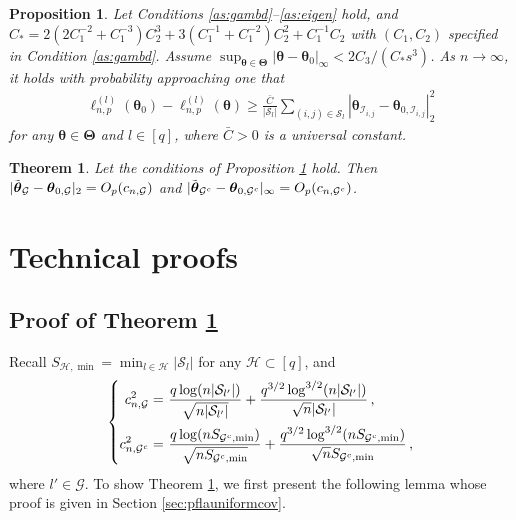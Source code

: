 \documentclass[10pt,a4paper]{amsart}
\theoremstyle{plain}
\newtheorem{theorem}{Theorem}
\newtheorem{proposition}{Proposition}
\theoremstyle{remark}
\newcommand{\btheta}{\boldsymbol \theta}
\newcommand{\bTheta}{\boldsymbol \Theta}
\newcommand{\btc}{{\rm c}}
\begin{document}
\begin{proposition}\label{pn:ident}
Let Conditions {\rm\ref{as:gambd}--\ref{as:eigen}} hold, and $C_*=2(2C_1^{-2}+C_1^{-3})C_2^3+3(C_1^{-1}+C_1^{-2})C_2^2+C_1^{-1}C_2$ with $(C_1,C_2)$ specified in Condition {\rm\ref{as:gambd}}. Assume $\sup_{\btheta\in\bTheta}|\btheta-\btheta_0|_\infty<2C_3/(C_*s^3)$.
As $n\rightarrow\infty$, it holds 
with probability approaching one that 
\begin{align*}
\ell_{n,p}^{(l)}(\btheta_0)-\ell_{n,p}^{(l)}(\btheta)\geq \frac{\bar{C}}{|\mathcal{S}_l|}\sum_{(i,j)\in\mathcal{S}_l}|\btheta_{\mathcal{I}_{i,j}}-\btheta_{0,\mathcal{I}_{i,j}}|_2^2
\end{align*}
for any $\btheta\in\bTheta$ and $l\in[q]$, where $\bar{C}>0$ is a universal constant.  
\end{proposition}

\begin{theorem}\label{tm:consistency}
Let the conditions of Proposition {\rm\ref{pn:ident}} hold. Then $|\tilde{\btheta}_{\mathcal{G}}-\btheta_{0,\mathcal{G}}|_2=O_{\rm p}(c_{n,\mathcal{G}})$ and $|\tilde{\btheta}_{\mathcal{G}^{\btc}}-\btheta_{0,\mathcal{G}^{\btc}}|_\infty=O_{\rm p}(c_{n,\mathcal{G}^{\btc}})$. 
\end{theorem}

\section{Technical proofs} \label{app:proofs}

\subsection{Proof of Theorem \ref{tm:consistency}} \label{pr:tm:consistency}
Recall $S_{\mathcal{H},\min}=\min_{l\in\mathcal{H}}|\mathcal{S}_l|$ for any $\mathcal{H}\subset[q]$, and \begin{align*}
\left\{\begin{aligned}
   c_{n,\mathcal{G}}^2=&~\frac{q\log(n|\mathcal{S}_{l'}|)}{\sqrt{n|\mathcal{S}_{l'}|}}+\frac{q^{3/2}\log^{3/2}(n|\mathcal{S}_{l'}|)}{\sqrt{n}|\mathcal{S}_{l'}|}\,, \\
   c_{n,\mathcal{G}^{\btc}}^2=&~\frac{q\log(nS_{\mathcal{G}^{\btc},\min})}{\sqrt{nS_{\mathcal{G}^{\btc},\min}}}+\frac{q^{3/2}\log^{3/2}(nS_{\mathcal{G}^{\btc},\min})}{\sqrt{n}S_{\mathcal{G}^{\btc},\min}}\,,
\end{aligned}\right.
\end{align*}
where $l'\in\mathcal{G}$. 
To show Theorem \ref{tm:consistency}, we first present the following lemma whose proof is given in Section \ref{sec:pflauniformcov}. 
\end{document}
